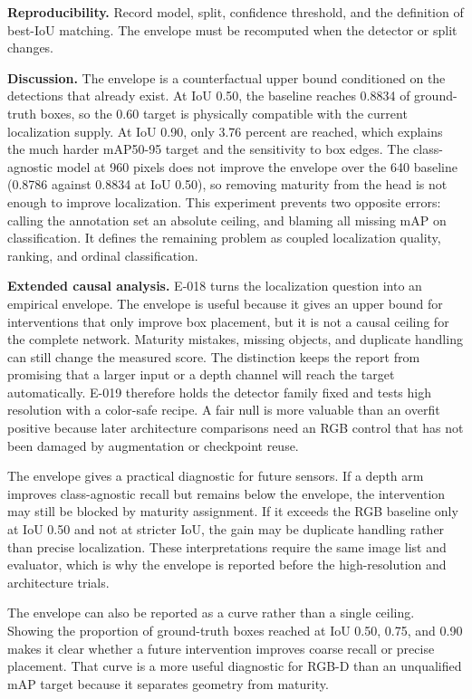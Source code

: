 \documentclass[preprint,12pt]{elsarticle}
\begin{document}
\textbf{Reproducibility.} Record model, split, confidence threshold, and the
definition of best-IoU matching. The envelope must be recomputed when the
detector or split changes.

\textbf{Discussion.} The envelope is a counterfactual upper bound conditioned
on the detections that already exist. At IoU 0.50, the baseline reaches 0.8834
of ground-truth boxes, so the 0.60 target is physically compatible with the
current localization supply. At IoU 0.90, only 3.76 percent are reached,
which explains the much harder mAP50-95 target and the sensitivity to box
edges. The class-agnostic model at 960 pixels does not improve the envelope
over the 640 baseline (0.8786 against 0.8834 at IoU 0.50), so
removing maturity from the head is not enough to improve localization. This
experiment prevents two opposite errors: calling the annotation set an
absolute ceiling, and blaming all missing mAP on classification. It defines
the remaining problem as coupled localization quality, ranking, and ordinal
classification.

\textbf{Extended causal analysis.} E-018 turns the localization question
into an empirical envelope. The envelope is useful because it gives an upper
bound for interventions that only improve box placement, but it is not a
causal ceiling for the complete network. Maturity mistakes, missing objects,
and duplicate handling can still change the measured score. The distinction
keeps the report from promising that a larger input or a depth channel will
reach the target automatically. E-019 therefore holds the detector family
fixed and tests high resolution with a color-safe recipe. A fair null is more
valuable than an overfit positive because later architecture comparisons need
an RGB control that has not been damaged by augmentation or checkpoint reuse.

The envelope gives a practical diagnostic for future sensors. If a depth arm
improves class-agnostic recall but remains below the envelope, the intervention
may still be blocked by maturity assignment. If it exceeds the RGB baseline
only at IoU 0.50 and not at stricter IoU, the gain may be duplicate handling
rather than precise localization. These interpretations require the same
image list and evaluator, which is why the envelope is reported before the
high-resolution and architecture trials.

The envelope can also be reported as a curve rather than a single ceiling.
Showing the proportion of ground-truth boxes reached at IoU 0.50, 0.75, and
0.90 makes it clear whether a future intervention improves coarse recall or
precise placement. That curve is a more useful diagnostic for RGB-D than an
unqualified mAP target because it separates geometry from maturity.
\end{document}
